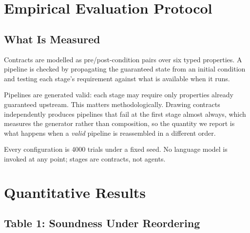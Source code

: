 \documentclass[10pt,twocolumn,letterpaper]{article}
\begin{document}
\section{Empirical Evaluation Protocol}



\subsection{What Is Measured}


Contracts are modelled as pre/post-condition pairs over six typed properties. A pipeline is checked by propagating the guaranteed state from an initial condition and testing each stage's requirement against what is available when it runs.

Pipelines are generated valid: each stage may require only properties already guaranteed upstream. This matters methodologically. Drawing contracts independently produces pipelines that fail at the first stage almost always, which measures the generator rather than composition, so the quantity we report is what happens when a \textit{valid} pipeline is reassembled in a different order.

Every configuration is 4000 trials under a fixed seed. No language model is invoked at any point; stages are contracts, not agents.




\section{Quantitative Results}



\subsection{Table 1: Soundness Under Reordering}
\begin{table}[htbp]
\centering
{}
\end{table}
\end{document}
